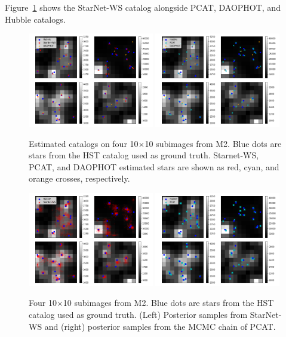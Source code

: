 Figure~\ref{fig:example_subimages} shows the StarNet-WS catalog alongside PCAT, DAOPHOT, and Hubble catalogs. 

\begin{figure}[ht]
    \centering
    \includegraphics[width=0.49\textwidth]{figures/example_subimages_ws.png}
    \includegraphics[width=0.49\textwidth]{figures/example_subimages_pcat.png}
    \caption{Estimated catalogs on four 10$\times$10 subimages from
    M2. Blue dots are stars from the HST catalog used as ground truth. 
    Starnet-WS, PCAT, and DAOPHOT estimated stars are shown as
    red, cyan, and orange crosses, respectively. }
    \label{fig:example_subimages}
\end{figure}

\begin{figure}[ht]
    \centering
    \includegraphics[width=0.49\textwidth]{figures/example_subimages_samples_ws.png}
    \includegraphics[width=0.49\textwidth]{figures/example_subimages_samples_pcat.png}
    \caption{Four 10$\times$10 subimages from
    M2. Blue dots are stars from the HST catalog used as ground truth. (Left) Posterior samples from StarNet-WS and (right) posterior samples from the MCMC chain of PCAT. }
    \label{fig:example_subimages_sampled}
\end{figure}


